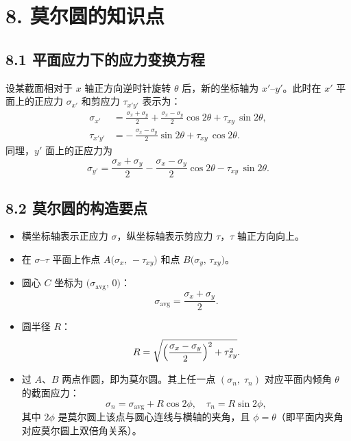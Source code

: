 \documentclass[12pt,a4paper]{article}
\begin{document}
\section*{8. 莫尔圆的知识点}

\subsection*{8.1 平面应力下的应力变换方程}
设某截面相对于 $x$ 轴正方向逆时针旋转 $\theta$ 后，新的坐标轴为 $x'–y'$。此时在 $x'$ 平面上的正应力 $\sigma_{x'}$ 和剪应力 $\tau_{x'y'}$ 表示为：
\begin{align}
  \sigma_{x'} 
  &= \frac{\sigma_x + \sigma_y}{2} 
  + \frac{\sigma_x - \sigma_y}{2} \cos 2\theta 
  + \tau_{xy}\,\sin 2\theta,\\[6pt]
  \tau_{x'y'} 
  &= -\,\frac{\sigma_x - \sigma_y}{2} \sin 2\theta 
       + \tau_{xy}\,\cos 2\theta.
\end{align}
同理，$y'$ 面上的正应力为
\[
  \sigma_{y'} 
  = \frac{\sigma_x + \sigma_y}{2} 
    - \frac{\sigma_x - \sigma_y}{2} \cos 2\theta 
    - \tau_{xy}\,\sin 2\theta.
\]

\subsection*{8.2 莫尔圆的构造要点}
\begin{itemize}
  \item 横坐标轴表示正应力 $\sigma$，纵坐标轴表示剪应力 $\tau$，$\tau$ 轴正方向向上。
  \item 在 $\sigma$–$\tau$ 平面上作点 $A\bigl(\sigma_x,\,-\tau_{xy}\bigr)$ 和点 $B\bigl(\sigma_y,\,\tau_{xy}\bigr)$。
  \item 圆心 $C$ 坐标为 $\bigl(\sigma_{\text{avg}},\,0\bigr)$：
  \[
    \sigma_{\text{avg}} = \frac{\sigma_x + \sigma_y}{2}.
  \]
  \item 圆半径 $R$：
  \[
    R 
    = \sqrt{\Bigl(\frac{\sigma_x - \sigma_y}{2}\Bigr)^2 + \tau_{xy}^2}.
  \]
  \item 过 $A$、$B$ 两点作圆，即为莫尔圆。其上任一点 $(\sigma_n,\;\tau_n)$ 对应平面内倾角 $\theta$ 的截面应力：
  \[
    \sigma_n = \sigma_{\text{avg}} + R\cos 2\phi,\quad
    \tau_n   = R\sin 2\phi,
  \]
  其中 $2\phi$ 是莫尔圆上该点与圆心连线与横轴的夹角，且 $\phi = \theta$（即平面内夹角对应莫尔圆上双倍角关系）。
\end{itemize}
\end{document}
